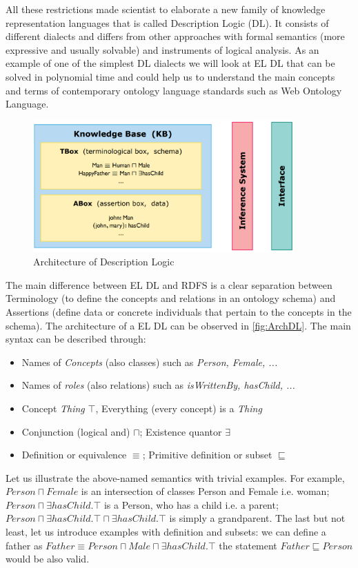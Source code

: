 		All these restrictions made scientist to elaborate a new family of knowledge representation languages that is called Description Logic (DL). It consists of different dialects and differs from other approaches with formal semantics (more expressive and usually solvable) and instruments of logical analysis. As an example of one of the simplest DL dialects we will look at EL DL that can be solved in polynomial time and could help us to understand the main concepts and terms of contemporary ontology language standards such as Web Ontology Language.
		
		\begin{figure}
			\centering
			\includegraphics[width=10cm]{images/ELDL.PNG}
			\caption{Architecture of Description Logic \cite[lecture 8, slide 1]{Kon10}}
			\label{fig:ArchDL}
		\end{figure}   
		The main difference between EL DL and RDFS is a clear separation between Terminology (to define the concepts and relations in an ontology schema) and Assertions (define data or concrete individuals that pertain to the concepts in the schema). The architecture of a EL DL can be observed in \autoref{fig:ArchDL}. The main syntax can be described through:
			\begin{itemize}
				\item Names of \textit{Concepts} (also classes) such as \textit{Person, Female, ...} 
				\item Names of \textit{roles} (also relations) such as \textit{isWrittenBy, hasChild, ...}
				\item Concept \textit{Thing} $\top$, Everything (every concept) is a \textit{Thing} 
				\item Conjunction (logical and) $\sqcap$; Existence quantor $\exists$ 
				\item Definition or equivalence $\equiv$; Primitive definition or subset $\sqsubseteq$
			\end{itemize}
		Let us illustrate the above-named semantics with trivial examples. For example,  $Person\sqcap Female$  is an intersection of classes Person and Female i.e. woman; $Person \sqcap \exists hasChild.\top$ is a Person, who has a child i.e. a parent; $Person \sqcap \exists hasChild.\top \sqcap \exists hasChild.\top $ is simply a grandparent. The last but not least, let us introduce examples with definition and subsets: we can define a father as $Father\equiv Person \sqcap Male \sqcap \exists hasChild.\top$ the statement $Father \sqsubseteq Person$ would be also valid.
		
